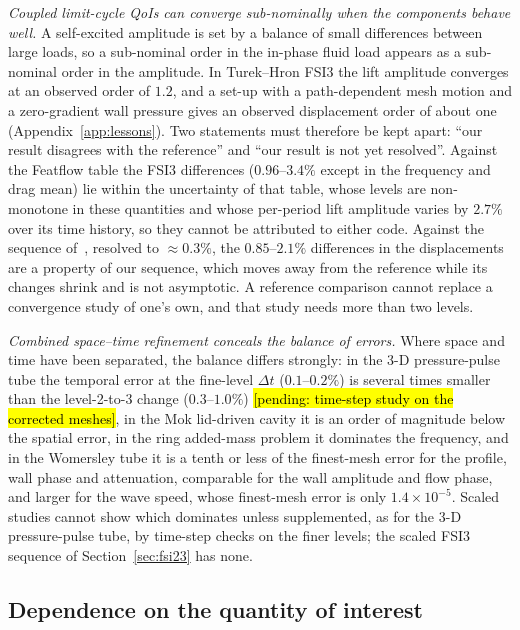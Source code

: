 \emph{Coupled limit-cycle QoIs can converge sub-nominally when the components behave well.}
A self-excited amplitude is set by a balance of small differences between large loads, so a sub-nominal order in the in-phase fluid load appears as a sub-nominal order in the amplitude.
In Turek--Hron FSI3 the lift amplitude converges at an observed order of $1.2$, and a set-up with a path-dependent mesh motion and a zero-gradient wall pressure gives an observed displacement order of about one (Appendix~\ref{app:lessons}).
Two statements must therefore be kept apart: ``our result disagrees with the reference'' and ``our result is not yet resolved''.
Against the Featflow table the FSI3 differences ($0.96$--$3.4\%$ except in the frequency and drag mean) lie within the uncertainty of that table, whose levels are non-monotone in these quantities and whose per-period lift amplitude varies by $2.7\%$ over its time history, so they cannot be attributed to either code.
Against the sequence of~\citet{Failer2020}, resolved to $\approx0.3\%$, the $0.85$--$2.1\%$ differences in the displacements are a property of our sequence, which moves away from the reference while its changes shrink and is not asymptotic.
A reference comparison cannot replace a convergence study of one's own, and that study needs more than two levels.

\emph{Combined space--time refinement conceals the balance of errors.}
Where space and time have been separated, the balance differs strongly: in the 3-D pressure-pulse tube the temporal error at the fine-level $\Delta t$ ($0.1$--$0.2\%$) is several times smaller than the level-2-to-3 change ($0.3$--$1.0\%$) \hl{[pending: time-step study on the corrected meshes]}, in the Mok lid-driven cavity it is an order of magnitude below the spatial error, in the ring added-mass problem it dominates the frequency, and in the Womersley tube it is a tenth or less of the finest-mesh error for the profile, wall phase and attenuation, comparable for the wall amplitude and flow phase, and larger for the wave speed, whose finest-mesh error is only $1.4\times10^{-5}$.
Scaled studies cannot show which dominates unless supplemented, as for the 3-D pressure-pulse tube, by time-step checks on the finer levels; the scaled FSI3 sequence of Section~\ref{sec:fsi23} has none.

\subsection{Dependence on the quantity of interest}\label{sec:qoi_dependence}

